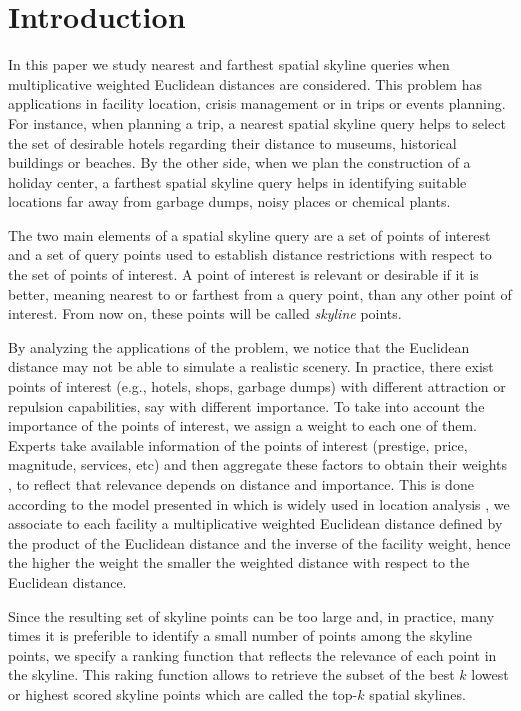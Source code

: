 \documentclass[11pt,onecolumn]{elsart3p}
\begin{document}
\section{Introduction}

In this paper we study nearest and farthest spatial skyline queries when multiplicative weighted Euclidean distances are considered. This problem has applications in facility location, crisis management or in trips or events planning. For instance, when planning a trip, a nearest spatial skyline query helps to select the set of desirable hotels regarding their distance to museums, historical buildings or beaches. By the other side, when we plan the construction of a holiday center, a farthest spatial skyline query helps in identifying suitable locations far away from garbage dumps, noisy places or chemical plants.

The two main elements of a spatial skyline query are a set of points of interest and a set of query points used to establish distance restrictions with respect to the set of points of interest. A point of interest is relevant or desirable if it is better, meaning nearest to or farthest from a query point, than any other point of interest. From now on, these points will be called {\it skyline} points.

By analyzing the applications of the problem, we notice that the Euclidean distance may not be able to simulate a realistic scenery. In practice, there exist points of interest (e.g., hotels, shops, garbage dumps) with different attraction or repulsion capabilities, say with different importance. To take into account the importance of the points of interest, we assign a weight to each one of them. Experts take available information of the points of interest (prestige, price, magnitude, services, etc) and then aggregate these factors to obtain their weights \cite{Dre94,DD02}, to reflect that relevance depends on distance and importance. This is done according to the model presented in \cite{BS97} which is widely used in location analysis \cite{FS14a,FS15,FS16,MT04}, we associate to each facility a multiplicative weighted Euclidean distance defined by the product of the Euclidean distance and the inverse of the facility weight, hence the higher the weight the smaller the weighted distance with respect to the Euclidean distance.


Since the resulting set of skyline points can be too large and, in practice, many times it is preferible to identify a small number of points among the skyline points, we specify a ranking function that reflects the relevance of each point in the skyline. This raking function allows to retrieve the subset of the best $k$ lowest or highest scored skyline points which are called the top-$k$ spatial skylines.
\end{document}
